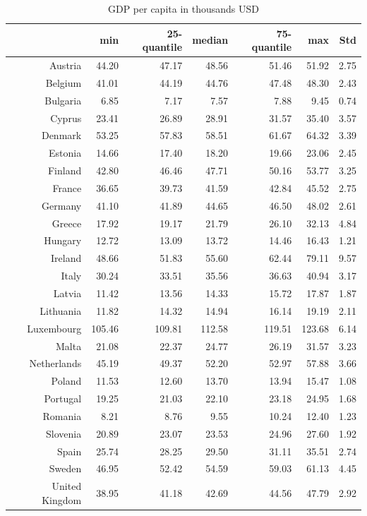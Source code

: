 \documentclass[a4paper,twoside,10pt]{article}
\begin{document}
\begin{table}[H]
	\centering
	\begin{tabular}{|r|rrrrr|r|}
  \hline
& min & 25-quantile & median & 75-quantile & max & Std \\ 
\hline
Austria & 44.20 & 47.17 & 48.56 & 51.46 & 51.92 & 2.75 \\ 
Belgium & 41.01 & 44.19 & 44.76 & 47.48 & 48.30 & 2.43 \\ 
Bulgaria & 6.85 & 7.17 & 7.57 & 7.88 & 9.45 & 0.74 \\ 
Cyprus & 23.41 & 26.89 & 28.91 & 31.57 & 35.40 & 3.57 \\ 
Denmark & 53.25 & 57.83 & 58.51 & 61.67 & 64.32 & 3.39 \\ 
\hline
Estonia & 14.66 & 17.40 & 18.20 & 19.66 & 23.06 & 2.45 \\ 
Finland & 42.80 & 46.46 & 47.71 & 50.16 & 53.77 & 3.25 \\ 
France & 36.65 & 39.73 & 41.59 & 42.84 & 45.52 & 2.75 \\ 
Germany & 41.10 & 41.89 & 44.65 & 46.50 & 48.02 & 2.61 \\ 
Greece & 17.92 & 19.17 & 21.79 & 26.10 & 32.13 & 4.84 \\ \hline
Hungary & 12.72 & 13.09 & 13.72 & 14.46 & 16.43 & 1.21 \\ 
Ireland & 48.66 & 51.83 & 55.60 & 62.44 & 79.11 & 9.57 \\ 
Italy & 30.24 & 33.51 & 35.56 & 36.63 & 40.94 & 3.17 \\ 
Latvia & 11.42 & 13.56 & 14.33 & 15.72 & 17.87 & 1.87 \\ 
Lithuania & 11.82 & 14.32 & 14.94 & 16.14 & 19.19 & 2.11 \\ \hline
Luxembourg & 105.46 & 109.81 & 112.58 & 119.51 & 123.68 & 6.14 \\ 
Malta & 21.08 & 22.37 & 24.77 & 26.19 & 31.57 & 3.23 \\ 
Netherlands & 45.19 & 49.37 & 52.20 & 52.97 & 57.88 & 3.66 \\ 
Poland & 11.53 & 12.60 & 13.70 & 13.94 & 15.47 & 1.08 \\ 
Portugal & 19.25 & 21.03 & 22.10 & 23.18 & 24.95 & 1.68 \\ \hline
Romania & 8.21 & 8.76 & 9.55 & 10.24 & 12.40 & 1.23 \\ 
Slovenia & 20.89 & 23.07 & 23.53 & 24.96 & 27.60 & 1.92 \\ 
Spain & 25.74 & 28.25 & 29.50 & 31.11 & 35.51 & 2.74 \\ 
Sweden & 46.95 & 52.42 & 54.59 & 59.03 & 61.13 & 4.45 \\ 
United Kingdom & 38.95 & 41.18 & 42.69 & 44.56 & 47.79 & 2.92 \\ 
\hline
	\end{tabular}
	\caption{GDP per capita in thousands USD}
	\label{GDP per capita}
\end{table}
\end{document}
